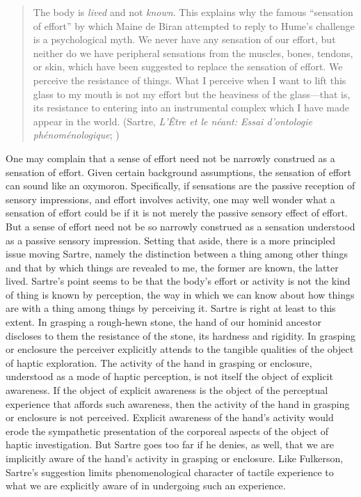 \begin{quote}
	The body is \emph{lived} and not \emph{known}. This explains why the famous ``sensation of effort'' by which Maine de Biran attempted to reply to Hume's challenge is a psychological myth. We never have any sensation of our effort, but neither do we have peripheral sensations from the muscles, bones, tendons, or skin, which have been suggested to replace the sensation of effort. We perceive the resistance of things. What I perceive when I want to lift this glass to my mouth is not my effort but the heaviness of the glass---that is, its resistance to entering into an instrumental complex which I have made appear in the world. (Sartre, \emph{L'Être et le néant: Essai d'ontologie phénoménologique}; \citealt[324]{Barnes:1958rt})
\end{quote}
One may complain that a sense of effort need not be  narrowly construed as a sensation of effort. Given certain background assumptions, the sensation of effort can sound like an oxymoron. Specifically, if sensations are the passive reception of sensory impressions, and effort involves activity, one may well wonder what a sensation of effort could be if it is not merely the passive sensory effect of effort. But a sense of effort need not be so narrowly construed as a sensation understood as a passive sensory impression. Setting that aside, there is a more principled issue moving Sartre, namely the distinction between a thing among other things and that by which things are revealed to me, the former are known, the latter lived. Sartre's point seems to be that the body's effort or activity is not the kind of thing is known by perception, the way in which we can know about how things are with a thing among things by perceiving it. Sartre is right at least to this extent. In grasping a rough-hewn stone, the hand of our hominid ancestor discloses to them the resistance of the stone, its hardness and rigidity. In grasping or enclosure the perceiver explicitly attends to the tangible qualities of the object of haptic exploration. The activity of the hand in grasping or enclosure, understood as a mode of haptic perception, is not itself the object of explicit awareness. If the object of explicit awareness is the object of the perceptual experience that affords such awareness, then the activity of the hand in grasping or enclosure is not perceived. Explicit awareness of the hand's activity would erode the sympathetic presentation of the corporeal aspects of the object of haptic investigation. But Sartre goes too far if he denies, as well, that we are implicitly aware of the hand's activity in grasping or enclosure. Like Fulkerson, Sartre's suggestion limits phenomenological character of tactile experience to what we are explicitly aware of in undergoing such an experience.

